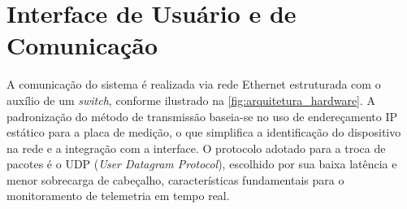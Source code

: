 \section{Interface de Usuário e de Comunicação}
\label{sec:interface}

A comunicação do sistema é realizada via rede Ethernet estruturada com o auxílio de um \textit{switch}, conforme ilustrado na \autoref{fig:arquitetura_hardware}. A padronização do método de transmissão baseia-se no uso de endereçamento IP estático para a placa de medição, o que simplifica a identificação do dispositivo na rede e a integração com a interface. O protocolo adotado para a troca de pacotes é o UDP (\textit{User Datagram Protocol}), escolhido por sua baixa latência e menor sobrecarga de cabeçalho, características fundamentais para o monitoramento de telemetria em tempo real.

